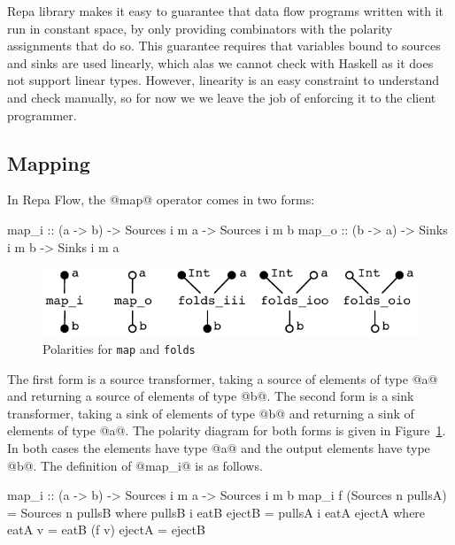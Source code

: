 Repa library makes it easy to guarantee that data flow programs written with it run in constant space, by only providing combinators with the polarity assignments that do so. This guarantee requires that variables bound to sources and sinks are used linearly, which alas we cannot check with Haskell as it does not support linear types. However, linearity is an easy constraint to understand and check manually, so for now we we leave the job of enforcing it to the client programmer.


\subsection{Mapping}
In Repa Flow, the @map@ operator comes in two forms:
\begin{code}
map_i :: (a -> b) -> Sources i m a -> Sources i m b
map_o :: (b -> a) -> Sinks   i m b -> Sinks   i m a
\end{code}

\begin{figure}
\begin{center}
\includegraphics[scale=0.8]{figures/maps.pdf}
\end{center}
\vspace{-0.5em}
\caption{Polarities for \texttt{map} and \texttt{folds}}
\label{f:Map}
\end{figure}

The first form is a source transformer, taking a source of elements of type @a@ and returning a source of elements of type @b@. The second form is a sink transformer, taking a sink of elements of type @b@ and returning a sink of elements of type @a@. The polarity diagram for both forms is given in Figure~\ref{f:Map}. In both cases the elements have type @a@ and the output elements have type @b@. The definition of @map_i@ is as follows. 
\begin{code}
map_i :: (a -> b) -> Sources i m a -> Sources i m b
map_i f (Sources n pullsA)
 = Sources n pullsB
 where  pullsB i eatB ejectB
         = pullsA i eatA ejectA
         where  eatA v = eatB (f v)
                ejectA = ejectB
\end{code}


